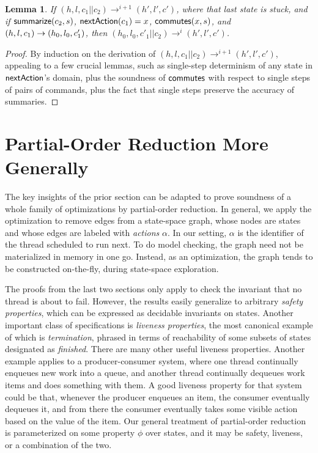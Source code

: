 \documentclass{amsbook}
\newtheorem{lemma}[theorem]{Lemma}
\theoremstyle{definition}
\theoremstyle{remark}
\numberwithin{section}{chapter}
\numberwithin{equation}{chapter}
\begin{document}
\begin{lemma}\label{translate_trace_commute}
  If $(h, l, c_1 || c_2) \to^{i+1} (h', l', c')$, where that last state is stuck, and if $\mathsf{summarize}(c_2, s)$, $\mathsf{nextAction}(c_1) = x$, $\mathsf{commutes}(x, s)$, and $(h, l, c_1) \to (h_0, l_0, c'_1)$, then $(h_0, l_0, c'_1 || c_2) \to^i (h', l', c')$.
\end{lemma}
\begin{proof}
  By induction on the derivation of $(h, l, c_1 || c_2) \to^{i+1} (h', l', c')$, appealing to a few crucial lemmas, such as single-step determinism of any state in $\mathsf{nextAction}$'s domain, plus the soundness of $\mathsf{commutes}$ with respect to single steps of pairs of commands, plus the fact that single steps preserve the accuracy of summaries.
\end{proof}

\section{Partial-Order Reduction More Generally}

The key insights of the prior section can be adapted to prove soundness of a whole family of optimizations by partial-order reduction.
In general, we apply the optimization to remove edges from a state-space graph, whose nodes are states and whose edges are labeled with \emph{actions} $\alpha$.
In our setting, $\alpha$ is the identifier of the thread scheduled to run next.
To do model checking, the graph need not be materialized in memory in one go.
Instead, as an optimization, the graph tends to be constructed on-the-fly, during state-space exploration.

The proofs from the last two sections only apply to check the invariant that no thread is about to fail.
However, the results easily generalize to arbitrary \emph{safety properties}, which can be expressed as decidable invariants on states.
Another important class of specifications is \emph{liveness properties}, the most canonical example of which is \emph{termination}, phrased in terms of reachability of some subsets of states designated as \emph{finished}.
There are many other useful liveness properties.
Another example applies to a producer-consumer system, where one thread continually enqueues new work into a queue, and another thread continually dequeues work items and does something with them.
A good liveness property for that system could be that, whenever the producer enqueues an item, the consumer eventually dequeues it, and from there the consumer eventually takes some visible action based on the value of the item.
Our general treatment of partial-order reduction is parameterized on some property $\phi$ over states, and it may be safety, liveness, or a combination of the two.
\end{document}
